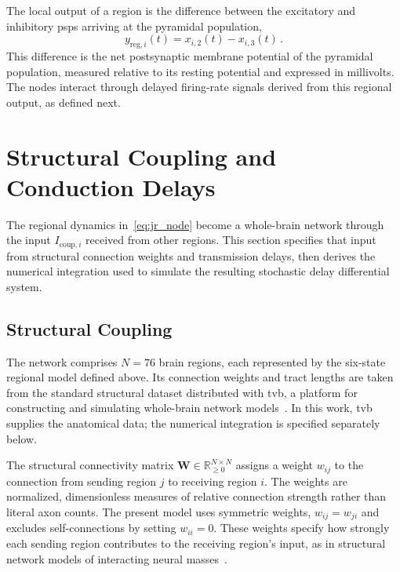 The local output of a region is the difference between the excitatory and inhibitory \acp{psp} arriving at the pyramidal population,
%
\begin{equation}
    y_{\mathrm{reg},i}(t)=x_{i,2}(t)-x_{i,3}(t)\,.
    \label{eq:regional_output}
\end{equation}
%
This difference is the net postsynaptic membrane potential of the pyramidal population, measured relative to its resting potential and expressed in millivolts.
The nodes interact through delayed firing-rate signals derived from this regional output, as defined next.

\section{Structural Coupling and Conduction Delays}
\label{sec:connectome}

The regional dynamics in~\eqref{eq:jr_node} become a whole-brain network through the input $I_{\mathrm{coup},i}$ received from other regions.
This section specifies that input from structural connection weights and transmission delays, then derives the numerical integration used to simulate the resulting stochastic delay differential system.

\subsection{Structural Coupling}

The network comprises $N=76$ brain regions, each represented by the six-state regional model defined above.
Its connection weights and tract lengths are taken from the standard structural dataset distributed with \ac{tvb}, a platform for constructing and simulating whole-brain network models~\cite{SanzLeon2013,SanzLeon2015}.
In this work, \ac{tvb} supplies the anatomical data; the numerical integration is specified separately below.

The structural connectivity matrix $\mathbf{W}\in\mathbb{R}_{\geq 0}^{N\times N}$ assigns a weight $w_{ij}$ to the connection from sending region $j$ to receiving region $i$.
The weights are normalized, dimensionless measures of relative connection strength rather than literal axon counts.
The present model uses symmetric weights, $w_{ij}=w_{ji}$ and excludes self-connections by setting $w_{ii}=0$.
These weights specify how strongly each sending region contributes to the receiving region's input, as in structural network models of interacting neural masses~\cite{SanzLeon2015}.

